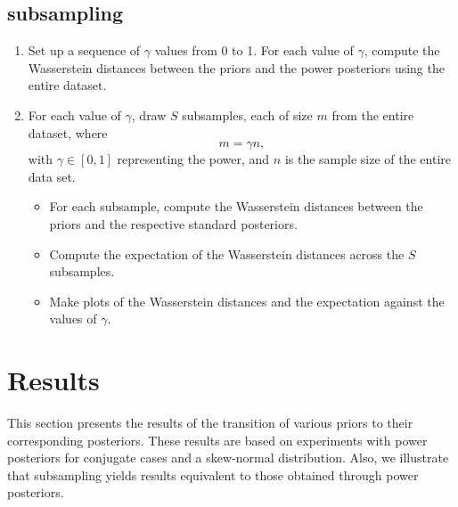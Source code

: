 \documentclass[12pt]{article}
\begin{document}
\subsection{subsampling}
\begin{enumerate}
	\item Set up a sequence of $\gamma$ values from 0 to 1. For each value of $\gamma$, compute the Wasserstein distances between the priors and the power posteriors using the entire dataset. 
	\item For each value of $\gamma$, draw $S$ subsamples, each of size $m$ from the entire dataset, where \[m=\gamma n,\] with $\gamma \in [0, 1]$ representing the power, and $n$ is the sample size of the entire data set.
\begin{itemize}
	\item For each subsample, compute the Wasserstein distances between the priors and the respective standard posteriors.
	\item Compute the expectation of the Wasserstein distances across the $S$ subsamples.
	\item  Make plots of the Wasserstein distances and the expectation against the values of $\gamma$.
\end{itemize}
\end{enumerate}



\section{Results}
This section presents the results of the transition of various priors to their corresponding posteriors. These results are based on experiments with power posteriors for conjugate cases and a skew-normal distribution. Also, we illustrate that subsampling yields results equivalent to those obtained through power posteriors.
\end{document}
